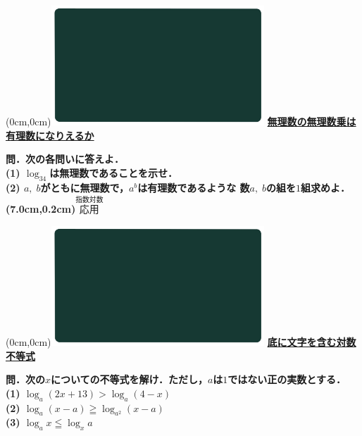 \documentclass[10pt,
fleqn,
dvipdfmx,
uplatex
]{jsarticle}
\begin{document}
\newpage



\at(0cm,0cm){\includegraphics[width=8cm,bb=0 0 1920 1080]{./youtube/thumbnails/templates/smart_background/指数対数.jpeg}}
{\color{orange}\bf\boldmath\normalsize\underline{無理数の無理数乗は有理数になりえるか}}\vspace{0.3zw}

\large 
\bf\boldmath 問．次の各問いに答えよ．\\
(1)  $\log _34$は無理数であることを示せ．\\
(2)  $a,\;b$がともに無理数で，$a^b$は有理数であるような
数$a,\;b$の組を$1$組求めよ．\\

\at(7.0cm,0.2cm){\small\color{bradorange}$\overset{\text{指数対数}}{\text{応用}}$}


\newpage



\at(0cm,0cm){\includegraphics[width=8cm,bb=0 0 1920 1080]{./youtube/thumbnails/templates/smart_background/指数対数.jpeg}}
{\color{orange}\bf\boldmath\Large\underline{底に文字を含む対数不等式}}\vspace{0.3zw}

\large 
\bf\boldmath 問．次の$x$についての不等式を解け．ただし，$a$は$1$ではない正の実数とする．\\
(1)  $\log _a\left(2x+{13}\right)>\log _a\left(4-x\right)$\\
(2)  $\log _a\left(x-a\right)\geqq \log _{a^2}\left(x-a\right)$\\
(3)  $\log _ax\leqq \log _xa$\\
\end{document}

